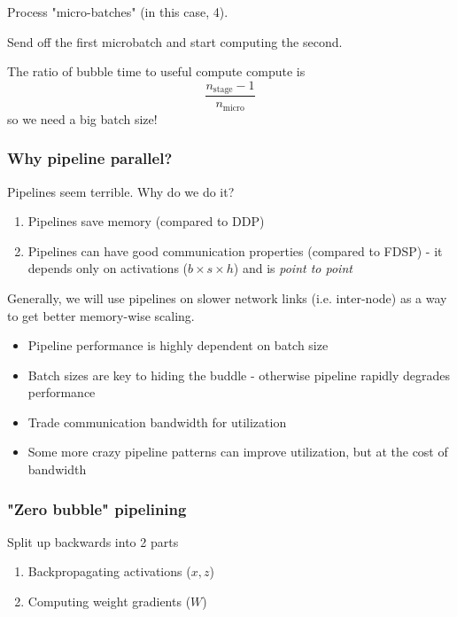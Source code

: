 \documentclass[12pt,twoside]{article}
\begin{document}
\begin{center}
    Process "micro-batches" (in this case, 4).
\end{center}

\begin{center}
    Send off the first microbatch and start computing the second.
\end{center}

The ratio of bubble time to useful compute compute is 
\[
    \frac{n_{\text{stage}} - 1}{n_{\text{micro}}}
\]
so we need a big batch size!

\subsubsection*{Why pipeline parallel?}

Pipelines seem terrible. Why do we do it?

\begin{enumerate}
    \item Pipelines save memory (compared to DDP)
    \item Pipelines can have good communication properties (compared to FDSP) - it depends only on activations (\(b \times s \times h\)) and is \textit{point to point} 
\end{enumerate}

Generally, we will use pipelines on slower network links (i.e. inter-node) as a way to get better memory-wise scaling.

\begin{itemize}
    \item Pipeline performance is highly dependent on batch size
    \item Batch sizes are key to hiding the buddle - otherwise pipeline rapidly degrades performance
    \item Trade communication  bandwidth for utilization
    \item Some more crazy pipeline patterns can improve utilization, but at the cost of bandwidth
\end{itemize}

\subsubsection*{"Zero bubble" pipelining}

Split up backwards into 2 parts

\begin{enumerate}
    \item Backpropagating activations (\(x, z\))
    \item Computing weight gradients (\(W\))
\end{enumerate}
\end{document}
